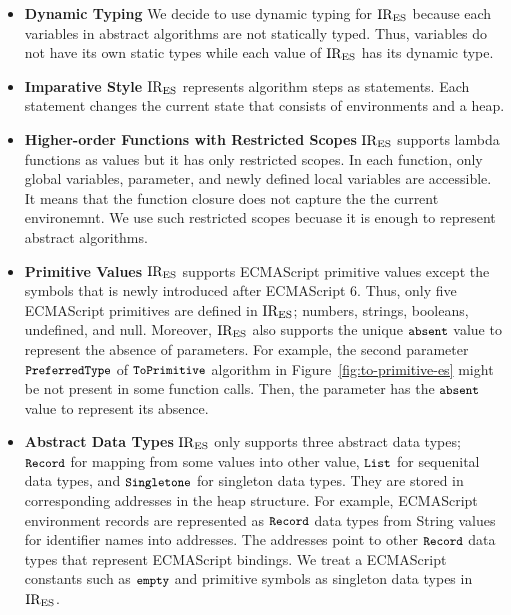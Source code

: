 \begin{itemize}
\item \textbf{Dynamic Typing} We decide to use dynamic typing for \( \text{IR}_\text{ES} \)
because each variables in abstract algorithms are not statically typed.
Thus, variables do not have its own static types while each value of \( \text{IR}_\text{ES} \)
has its dynamic type.

\item \textbf{Imparative Style} \( \text{IR}_\text{ES} \) represents algorithm steps
as statements. Each statement changes the current state
that consists of environments and a heap.

\item \textbf{Higher-order Functions with Restricted Scopes} \( \text{IR}_\text{ES} \) supports
lambda functions as values but it has only restricted scopes. In each function,
only global variables, parameter, and newly defined local variables are accessible.
It means that the function closure does not capture the the current environemnt.
We use such restricted scopes becuase it is enough to represent abstract algorithms.

\item \textbf{Primitive Values} \( \text{IR}_\text{ES} \) supports ECMAScript primitive values except
the symbols that is newly introduced after ECMAScript 6. Thus, only five ECMAScript primitives
are defined in \( \text{IR}_\text{ES} \); numbers, strings, booleans, undefined, and null.
Moreover, \( \text{IR}_\text{ES} \) also supports the unique \( \texttt{\small absent} \) value to represent
the absence of parameters. For example, the second parameter \( \texttt{\small PreferredType} \)
of \( \texttt{\small ToPrimitive} \) algorithm in Figure~\ref{fig:to-primitive-es} might be
not present in some function calls. Then, the parameter has the \( \texttt{\small absent} \) value
to represent its absence.

\item \textbf{Abstract Data Types} \( \text{IR}_\text{ES} \) only supports three abstract data types;
\( \texttt{\small Record} \) for mapping from some values into other value,
\( \texttt{\small List} \) for sequenital data types,
and \( \texttt{\small Singletone} \) for singleton data types.
They are stored in corresponding addresses in the heap structure.
For example, ECMAScript environment records are represented as \( \texttt{\small Record} \) data types
from String values for identifier names into addresses.
The addresses point to other \( \texttt{\small Record} \) data types that represent ECMAScript bindings.
We treat a ECMAScript constants such as \( \texttt{\small empty} \) and primitive symbols as singleton
data types in \( \text{IR}_\text{ES} \).
\end{itemize}

